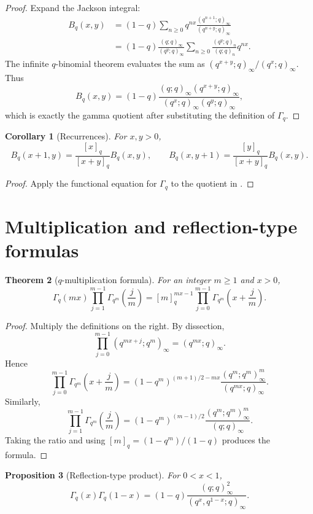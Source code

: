 \documentclass[11pt,oneside,openany]{book}
\newtheorem{theorem}{Theorem}[chapter]
\newtheorem{proposition}[theorem]{Proposition}
\newtheorem{corollary}[theorem]{Corollary}
\theoremstyle{definition}
\theoremstyle{remark}
\begin{document}
\begin{proof}
Expand the Jackson integral:
\begin{align*}
 B_q(x,y)
 &=(1-q)\sum_{n\ge0}q^{nx}
 \frac{(q^{n+1};q)_\infty}{(q^{n+y};q)_\infty}\\
 &=(1-q)\frac{(q;q)_\infty}{(q^y;q)_\infty}
 \sum_{n\ge0}\frac{(q^y;q)_n}{(q;q)_n}q^{nx}.
\end{align*}
The infinite $q$-binomial theorem evaluates the sum as
\(
 (q^{x+y};q)_\infty/(q^x;q)_\infty.
\)
Thus
\[
 B_q(x,y)
 =(1-q)\frac{(q;q)_\infty(q^{x+y};q)_\infty}
 {(q^x;q)_\infty(q^y;q)_\infty},
\]
which is exactly the gamma quotient after substituting the definition of $\Gamma_q$.
\end{proof}

\begin{corollary}[Recurrences]\label{cor:qbeta-recurrence}
For $x,y>0$,
\[
 B_q(x+1,y)=\frac{[x]_q}{[x+y]_q}B_q(x,y),
 \qquad
 B_q(x,y+1)=\frac{[y]_q}{[x+y]_q}B_q(x,y).
\]
\end{corollary}

\begin{proof}
Apply the functional equation for $\Gamma_q$ to the quotient in .
\end{proof}

\section{Multiplication and reflection-type formulas}

\begin{theorem}[$q$-multiplication formula]\label{thm:qgamma-multiplication}
For an integer $m\ge1$ and $x>0$,
\[
 \Gamma_q(mx)\prod_{j=1}^{m-1}\Gamma_{q^m}\!\left(\frac jm\right)
 =[m]_q^{mx-1}
 \prod_{j=0}^{m-1}\Gamma_{q^m}\!\left(x+\frac jm\right).
\]
\end{theorem}

\begin{proof}
Multiply the definitions on the right.  By dissection,
\[
 \prod_{j=0}^{m-1}(q^{mx+j};q^m)_\infty=(q^{mx};q)_\infty.
\]
Hence
\[
 \prod_{j=0}^{m-1}\Gamma_{q^m}\!\left(x+\frac jm\right)
 =(1-q^m)^{(m+1)/2-mx}
 \frac{(q^m;q^m)_\infty^m}{(q^{mx};q)_\infty}.
\]
Similarly,
\[
 \prod_{j=1}^{m-1}\Gamma_{q^m}\!\left(\frac jm\right)
 =(1-q^m)^{(m-1)/2}
 \frac{(q^m;q^m)_\infty^m}{(q;q)_\infty}.
\]
Taking the ratio and using
\(
 [m]_q=(1-q^m)/(1-q)
\)
produces the formula.
\end{proof}

\begin{proposition}[Reflection-type product]\label{prop:qgamma-reflection}
For $0<x<1$,
\[
 \Gamma_q(x)\Gamma_q(1-x)
 =(1-q)\frac{(q;q)_\infty^2}
 {(q^x,q^{1-x};q)_\infty}.
\]
\end{proposition}
\end{document}
